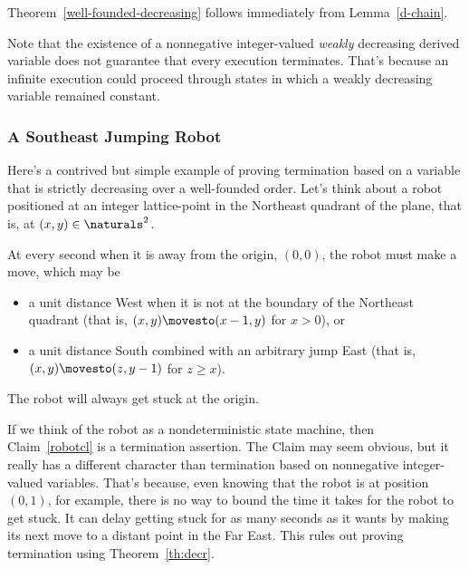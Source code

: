 Theorem~\ref{well-founded-decreasing} follows immediately from
Lemma~\ref{d-chain}.

Note that the existence of a nonnegative integer-valued \emph{weakly}
decreasing derived variable does not guarantee that every execution
terminates.  That's because an infinite execution could proceed through
states in which a weakly decreasing variable remained constant.

\subsubsection{A Southeast Jumping Robot}

\iffalse Begin by defining the trivial ``pick how long'' game: P1 picks $n
\in \naturals$, the P2 and P1 alternate making forced moves.  The game
ends after $n$ forced moves; the last person to move wins.  So P1 strategy
is ``pick and even number.''  Insert here the discussion of ``terminates,
but no bound on number of steps...'' used below.

May also tell the ``guess a bigger number game''joke.
\fi

Here's a contrived but simple example of proving termination based on a
variable that is strictly decreasing over a well-founded order.  Let's
think about a robot positioned at an integer lattice-point in the
Northeast quadrant of the plane, that is, at $(x,y) \in \naturals^2$.

At every second when it is away from the origin, $(0,0)$, the robot must
make a move, which may be
\begin{itemize}

\item a unit distance West when it is not at the boundary of the Northeast
  quadrant (that is, $(x,y) \movesto (x-1,y)$ for $x>0$), or

\item a unit distance South combined with an arbitrary jump East (that is,
     $(x,y) \movesto (z,y-1)$ for $z\geq x$).

\end{itemize}
\begin{claim}\label{robotcl}
The robot will always get stuck at the origin.
\end{claim}

If we think of the robot as a nondeterministic state machine, then
Claim~\ref{robotcl} is a termination assertion.  The Claim may seem
obvious, but it really has a different character than termination based on
nonnegative integer-valued variables.  That's because, even knowing that
the robot is at position $(0,1)$, for example, there is no way to bound
the time it takes for the robot to get stuck.  It can delay getting stuck
for as many seconds as it wants by making its next move to a distant point
in the Far East.  This rules out proving termination using
Theorem~\ref{th:decr}.

